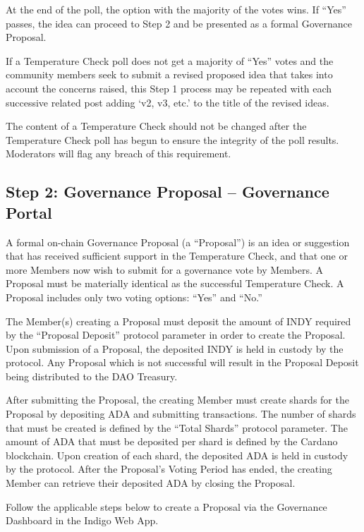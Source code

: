 At the end of the poll, the option with the majority of the votes wins.
If ``Yes'' passes, the idea can proceed to Step 2 and be presented as a
formal Governance Proposal.

If a Temperature Check poll does not get a majority of ``Yes'' votes and
the community members seek to submit a revised proposed idea that takes
into account the concerns raised, this Step 1 process may be repeated
with each successive related post adding `v2, v3, etc.' to the title of
the revised ideas.

The content of a Temperature Check should not be changed after the
Temperature Check poll has begun to ensure the integrity of the poll
results. Moderators will flag any breach of this requirement.

\hypertarget{step-2-governance-proposal-governance-portal}{%
\subsection{Step 2: Governance Proposal -- Governance
Portal}\label{step-2-governance-proposal-governance-portal}}

A formal on-chain Governance Proposal (a ``Proposal'') is an idea or
suggestion that has received sufficient support in the Temperature
Check, and that one or more Members now wish to submit for a governance
vote by Members. A Proposal must be materially identical as the
successful Temperature Check. A Proposal includes only two voting
options: ``Yes'' and ``No.''

The Member(s) creating a Proposal must deposit the amount of INDY
required by the ``Proposal Deposit'' protocol parameter in order to
create the Proposal. Upon submission of a Proposal, the deposited INDY
is held in custody by the protocol. Any Proposal which is not successful
will result in the Proposal Deposit being distributed to the DAO
Treasury.

After submitting the Proposal, the creating Member must create shards
for the Proposal by depositing ADA and submitting transactions. The
number of shards that must be created is defined by the ``Total Shards''
protocol parameter. The amount of ADA that must be deposited per shard
is defined by the Cardano blockchain. Upon creation of each shard, the
deposited ADA is held in custody by the protocol. After the Proposal's
Voting Period has ended, the creating Member can retrieve their
deposited ADA by closing the Proposal.

Follow the applicable steps below to create a Proposal via the
Governance Dashboard in the Indigo Web App.

